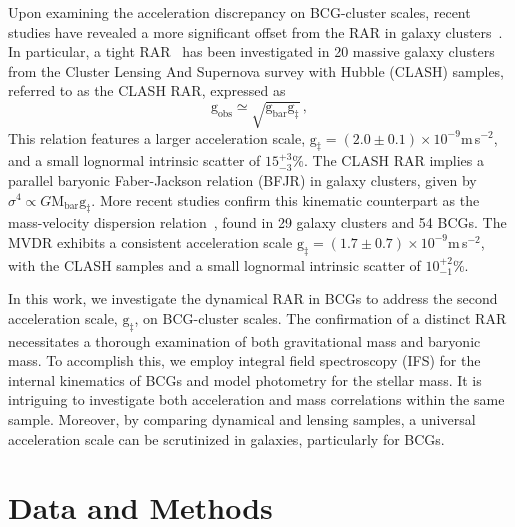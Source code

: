 \documentclass[a4paper, two-column, twocolappendix]{aa}
\newcommand{\percent}{\ensuremath{\%}}
\newcommand{\Mbar}{\mathrm{M}_\mathrm{bar}}
\newcommand{\gbar}{\mathrm{g}_\mathrm{bar}}
\newcommand{\gobs}{\mathrm{g}_\mathrm{obs}}
\newcommand{\gddag}{\mathrm{g}_\mathrm{\ddagger}}
\begin{document}
Upon examining the acceleration discrepancy on BCG-cluster scales, 
 recent studies have revealed a more significant offset 
 from the RAR in galaxy clusters~\citep{CD20, Tian20, Pradyumna21, Eckert22, Tam23, Liu23, li23}. 
In particular, a tight RAR~\citep{Tian20} has been investigated in 20 massive galaxy clusters 
 from the Cluster Lensing And Supernova survey with Hubble (CLASH) samples, 
 referred to as the CLASH RAR, expressed as 
\begin{equation}\label{eq:CLASHRAR}
 \gobs\simeq\sqrt{\gbar\gddag}\,,
\end{equation}
This relation features a larger acceleration scale, $\gddag=(2.0\pm0.1)\times10^{-9}$m\,s$^{-2}$, 
 and a small lognormal intrinsic scatter of $15^{+3}_{-3}\percent$.
The CLASH RAR implies a parallel baryonic Faber-Jackson relation (BFJR) in galaxy clusters, 
 given by $\sigma^4\propto G\Mbar\gddag$. 
More recent studies confirm this kinematic counterpart as 
 the mass-velocity dispersion relation~\citep[MVDR;][]{Tian21a, Tian21b},
 found in 29 galaxy clusters and 54 BCGs.
The MVDR exhibits a consistent acceleration scale $\gddag=(1.7\pm0.7)\times10^{-9}$m\,s$^{-2}$,
 with the CLASH samples and a small lognormal intrinsic scatter of $10^{+2}_{-1}\percent$. 


 In this work, we investigate the dynamical RAR in BCGs to address the second acceleration scale, $\gddag$, 
  on BCG-cluster scales. 
The confirmation of a distinct RAR necessitates a thorough examination of both gravitational mass and baryonic mass. 
To accomplish this, we employ integral field spectroscopy (IFS) for the internal kinematics of BCGs and model photometry for the stellar mass. 
It is intriguing to investigate both acceleration and mass correlations within the same sample. 
Moreover, by comparing dynamical and lensing samples, a universal acceleration scale can be scrutinized in galaxies, particularly for BCGs.


%
%

\section{Data and Methods}\label{sec:Method}
\end{document}
